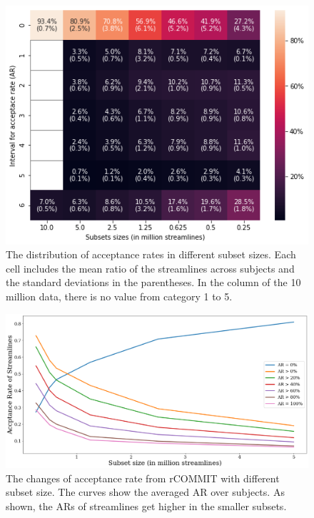 \begin{figure}[ht]
    \centering
    \includegraphics[width= 15cm]{figures/heatmap.png}
        \caption{The distribution of acceptance rates in different subset sizes. Each cell includes the mean ratio of 
        the streamlines across subjects and the standard deviations in the parentheses. In the column of the 10 million data, there is no value from category 1 to 5.
        }
    \label{fig:heatmap}
\end{figure}

\begin{figure}[ht]
    \centering
    \includegraphics[width= 15cm]{figures/ARplot.png}
        \caption{The changes of acceptance rate from rCOMMIT with different subset size.
        The curves show the averaged AR over subjects. As shown, the ARs of streamlines get higher in the smaller
        subsets.}
    \label{fig:ARplot}
\end{figure}

